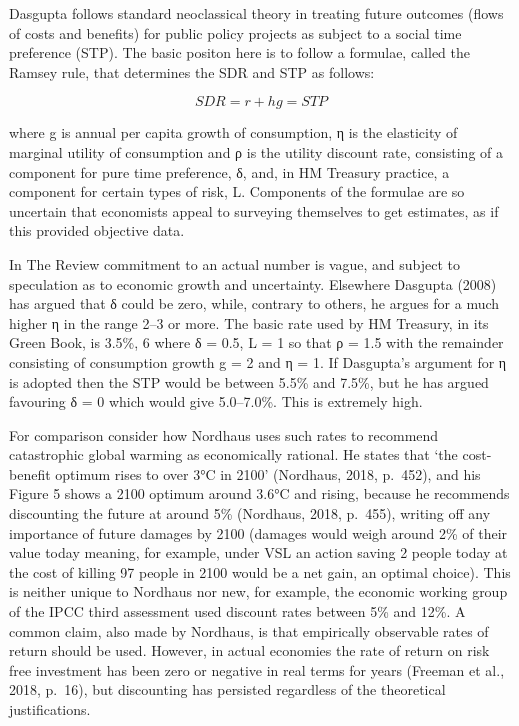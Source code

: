 \documentclass[
]{book}
\begin{document}
Dasgupta follows standard neoclassical theory in treating future outcomes (flows of costs
and benefits) for public policy projects as subject to a social time preference (STP). The basic positon
here is to follow a formulae, called the Ramsey rule, that determines the SDR and STP as follows:

\[SDR = r + h g = STP\]

where g is annual per capita growth of consumption, η is the elasticity of marginal utility of
consumption and ρ is the utility discount rate, consisting of a component for pure time preference, δ, and, in
HM Treasury practice, a component for certain types of risk, L. Components of the formulae are so
uncertain that economists appeal to surveying themselves to get estimates, as if
this provided objective data.

In The Review commitment to an actual number is vague, and subject to
speculation as to economic growth and uncertainty. Elsewhere Dasgupta (2008) has argued that δ
could be zero, while, contrary to others, he argues for a much higher η in the range 2--3 or more.
The basic rate used by HM Treasury, in its Green Book, is 3.5\%, 6 where δ = 0.5, L = 1 so
that ρ = 1.5 with the remainder consisting of consumption growth g = 2 and η = 1. If Dasgupta's
argument for η is adopted then the STP would be between 5.5\% and 7.5\%, but he has argued favouring δ =
0 which would give 5.0--7.0\%. This is extremely high.

For comparison consider how Nordhaus uses such rates to recommend catastrophic global
warming as economically rational. He states that `the cost-benefit optimum rises to over 3°C in
2100' (Nordhaus, 2018, p.~452), and his Figure 5 shows a 2100 optimum around 3.6°C and rising,
because he recommends discounting the future at around 5\% (Nordhaus, 2018, p.~455), writing off
any importance of future damages by 2100 (damages would weigh around 2\% of their value today
meaning, for example, under VSL an action saving 2 people today at the cost of killing 97 people in
2100 would be a net gain, an optimal choice). This is neither unique to Nordhaus nor new, for
example, the economic working group of the IPCC third assessment used discount rates between
5\% and 12\%. A common claim, also made by Nordhaus, is that empirically
observable rates of return should be used. However, in actual economies the rate of return on risk
free investment has been zero or negative in real terms for years (Freeman et al., 2018, p.~16), but
discounting has persisted regardless of the theoretical justifications.
\end{document}
